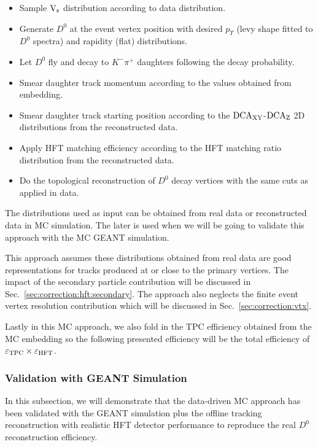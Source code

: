 \documentclass[%
 reprint,	
 amsmath,amssymb,
 aps,
 prc,
]{revtex4-1}
\begin{document}
\begin{itemize}
\item Sample $\textup{V}_\textup{z}$ distribution according to data distribution.
\item Generate $D^0$ at the event vertex position with desired $p_T$ (levy shape fitted to $D^0$ spectra) and rapidity (flat) distributions.
\item Let $D^0$ fly and decay to $K^-\pi^+$ daughters following the decay probability.
\item Smear daughter track momentum according to the values obtained from embedding.
\item Smear daughter track starting position according to the $\textup{DCA}_{\textup{XY}}$-$\textup{DCA}_\textup{Z}$ 2D distributions from the reconstructed data.
\item Apply HFT matching efficiency according to the HFT matching ratio distribution from the reconstructed data.
\item Do the topological reconstruction of $D^0$ decay vertices with the same cuts as applied in data.
\end{itemize}
The distributions used as input can be obtained from real data or reconstructed data in MC simulation. The later is used when we will be going to validate this approach with the MC GEANT simulation. 

This approach assumes these distributions obtained from real data are good representations for tracks produced at or close to the primary vertices. The impact of the secondary particle contribution will be discussed in Sec.~\ref{sec:correction:hft:secondary}. The approach also neglects the finite event vertex resolution contribution which will be discussed in Sec.~\ref{sec:correction:vtx}.

Lastly in this MC approach, we also fold in the TPC efficiency obtained from the MC embedding so the following presented efficiency will be the total efficiency of $\varepsilon_{\rm TPC}\times\varepsilon_{\rm HFT}$.

\subsubsection{\label{sec:correction:hft:validation}Validation with GEANT Simulation}

In this subsection, we will demonstrate that the data-driven MC approach has been validated with the GEANT simulation plus the offline tracking reconstruction with realistic HFT detector performance to reproduce the real $D^0$ reconstruction efficiency.
\end{document}
